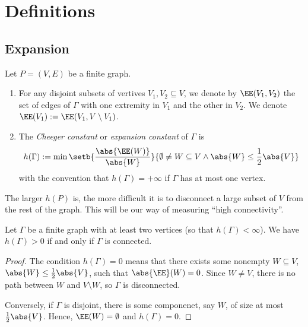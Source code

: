 \section{Definitions}

\subsection{Expansion}


\begin{definition}
    Let $P = (V ,E)$ be a finite graph.
    \begin{enumerate}[(1)]
        \item For any disjoint subsets of vertives $V_1,V_2 \subseteq V$, 
        we denote by $\EE(V_1, V_2)$ the set of edges of $\Gamma$ with 
        one extremity in $V_1$ and the other in $V_2$. 
        We denote $\EE(V_1) := \EE(V_1, V \setminus V_1)$.
        \item The \emph{Cheeger constant} or \emph{expansion constant} 
        of $\Gamma$ is
        \[
            h(\Gamma) := \min\setb{\frac{\abs{\EE(W)}}{\abs{W}}}
            {\emptyset \neq W \subseteq V \land \abs{W} \le \frac{1}{2}\abs{V}}
        \]
        with the convention that $h(\Gamma) = +\infty$ if $\Gamma$ has 
        at most one vertex.
    \end{enumerate}
\end{definition}

The larger $h(P)$ is, the more difficult it is to disconnect a large subset of $V$ from 
the rest of the graph. This will be our way of measuring ``high connectivity''.

\begin{lemma}
    Let $\Gamma$ be a finite graph with at least two vertices (so that $h(\Gamma) < \infty$).
    We have $h(\Gamma) > 0$ if and only if $\Gamma$ is connected.
\end{lemma}

\begin{proof}
    The condition $h(\Gamma) = 0$ means that there exists some nonempty $W \subseteq V$, 
    $\abs{W} \le \frac{1}{2}\abs{V}$, such that $\abs{\EE}(W) = 0$. Since $W \neq V$,
    there is no path between $W$ and $V \setminus W$, so $\Gamma$ is disconnected.
    
    Conversely, if $\Gamma$ is disjoint, there is some componenet, say $W$, of size 
    at most $\frac{1}{2} \abs{V}$. Hence, $\EE(W) = \emptyset$ and $h(\Gamma) = 0$.
\end{proof}